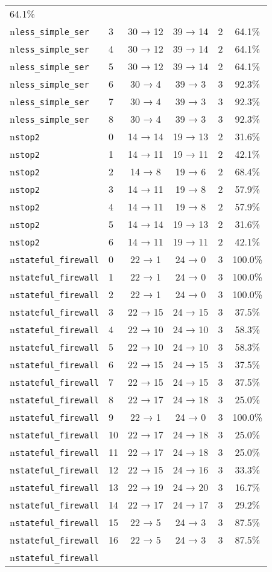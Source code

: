 \begin{tabular}{llcccc}
64.1\% \\n\texttt{less\_simple\_ser} & 3 & 30 → 12 & 39 → 14 & 2 & 64.1\% \\n\texttt{less\_simple\_ser} & 4 & 30 → 12 & 39 → 14 & 2 & 64.1\% \\n\texttt{less\_simple\_ser} & 5 & 30 → 12 & 39 → 14 & 2 & 64.1\% \\n\texttt{less\_simple\_ser} & 6 & 30 → 4 & 39 → 3 & 3 & 92.3\% \\n\texttt{less\_simple\_ser} & 7 & 30 → 4 & 39 → 3 & 3 & 92.3\% \\n\texttt{less\_simple\_ser} & 8 & 30 → 4 & 39 → 3 & 3 & 92.3\% \\n\texttt{stop2} & 0 & 14 → 14 & 19 → 13 & 2 & 31.6\% \\n\texttt{stop2} & 1 & 14 → 11 & 19 → 11 & 2 & 42.1\% \\n\texttt{stop2} & 2 & 14 → 8 & 19 → 6 & 2 & 68.4\% \\n\texttt{stop2} & 3 & 14 → 11 & 19 → 8 & 2 & 57.9\% \\n\texttt{stop2} & 4 & 14 → 11 & 19 → 8 & 2 & 57.9\% \\n\texttt{stop2} & 5 & 14 → 14 & 19 → 13 & 2 & 31.6\% \\n\texttt{stop2} & 6 & 14 → 11 & 19 → 11 & 2 & 42.1\% \\n\texttt{stateful\_firewall} & 0 & 22 → 1 & 24 → 0 & 3 & 100.0\% \\n\texttt{stateful\_firewall} & 1 & 22 → 1 & 24 → 0 & 3 & 100.0\% \\n\texttt{stateful\_firewall} & 2 & 22 → 1 & 24 → 0 & 3 & 100.0\% \\n\texttt{stateful\_firewall} & 3 & 22 → 15 & 24 → 15 & 3 & 37.5\% \\n\texttt{stateful\_firewall} & 4 & 22 → 10 & 24 → 10 & 3 & 58.3\% \\n\texttt{stateful\_firewall} & 5 & 22 → 10 & 24 → 10 & 3 & 58.3\% \\n\texttt{stateful\_firewall} & 6 & 22 → 15 & 24 → 15 & 3 & 37.5\% \\n\texttt{stateful\_firewall} & 7 & 22 → 15 & 24 → 15 & 3 & 37.5\% \\n\texttt{stateful\_firewall} & 8 & 22 → 17 & 24 → 18 & 3 & 25.0\% \\n\texttt{stateful\_firewall} & 9 & 22 → 1 & 24 → 0 & 3 & 100.0\% \\n\texttt{stateful\_firewall} & 10 & 22 → 17 & 24 → 18 & 3 & 25.0\% \\n\texttt{stateful\_firewall} & 11 & 22 → 17 & 24 → 18 & 3 & 25.0\% \\n\texttt{stateful\_firewall} & 12 & 22 → 15 & 24 → 16 & 3 & 33.3\% \\n\texttt{stateful\_firewall} & 13 & 22 → 19 & 24 → 20 & 3 & 16.7\% \\n\texttt{stateful\_firewall} & 14 & 22 → 17 & 24 → 17 & 3 & 29.2\% \\n\texttt{stateful\_firewall} & 15 & 22 → 5 & 24 → 3 & 3 & 87.5\% \\n\texttt{stateful\_firewall} & 16 & 22 → 5 & 24 → 3 & 3 & 87.5\% \\n\texttt{stateful\_firewall} & 
\end{tabular}
